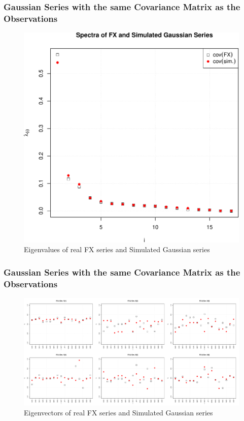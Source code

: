 \documentclass{beamer}
\begin{document}
\begin{frame}
  \frametitle{Gaussian Series with the same Covariance Matrix as the
    Observations}
  \begin{figure}[htb!]
    \centering
    \includegraphics[scale=0.4]{Gaussian_eigenvalues.pdf}
    \caption{\scriptsize Eigenvalues of real FX series and Simulated Gaussian series}
  \end{figure}
\end{frame}

\begin{frame}
  \frametitle{Gaussian Series with the same Covariance Matrix as the
    Observations}
  \begin{figure}[htb!]
    \centering
    \includegraphics[width=1.0\linewidth]{Gaussian_eigenvectors.pdf}
    \caption{\scriptsize Eigenvectors of real FX series and Simulated Gaussian series}
  \end{figure}
\end{frame}
\end{document}
